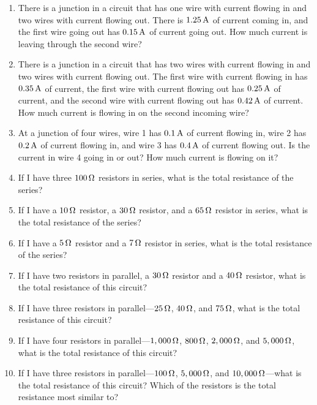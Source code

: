 
\begin{enumerate}
\item There is a junction in a circuit that has one wire with current flowing in and two wires with current flowing out.  There is $1.25\,\si{\ampere}$ of current coming in, and the first wire going out has $0.15\,\si{\ampere}$ of current going out.  How much current is leaving through the second wire?
\item There is a junction in a circuit that has two wires with current flowing in and two wires with current flowing out.  The first wire with current flowing in has $0.35\,\si{\ampere}$ of current, the first wire with current flowing out has $0.25\,\si{\ampere}$ of current, and the second wire with current flowing out has $0.42\,\si{\ampere}$ of current.  How much current is flowing in on the second incoming wire?
\item At a junction of four wires, wire 1 has $0.1\,\si{\ampere}$ of current flowing in, wire 2 has $0.2\,\si{\ampere}$ of current flowing in, and wire 3 has $0.4\,\si{\ampere}$ of current flowing out.  Is the current in wire 4 going in or out?  How much current is flowing on it?
\item If I have three $100\,\si{\ohm}$ resistors in series, what is the total resistance of the series?
\item If I have a $10\,\si{\ohm}$ resistor, a $30\,\si{\ohm}$ resistor, and a $65\,\si{\ohm}$ resistor in series, what is the total resistance of the series?
\item If I have a $5\,\si{\ohm}$ resistor and a $7\,\si{\ohm}$ resistor in series, what is the total resistance of the series?
\item If I have two resistors in parallel, a $30\,\si{\ohm}$ resistor and a $40\,\si{\ohm}$ resistor, what is the total resistance of this circuit?
\item If I have three resistors in parallel---$25\,\si{\ohm}$, $40\,\si{\ohm}$, and $75\,\si{\ohm}$, what is the total resistance of this circuit?
\item If I have four resistors in parallel---$1,000\,\si{\ohm}$, $800\,\si{\ohm}$, $2,000\,\si{\ohm}$, and $5,000\,\si{\ohm}$, what is the total resistance of this circuit?
\item If I have three resistors in parallel---$100\,\si{\ohm}$, $5,000\,\si{\ohm}$, and $10,000\,\si{\ohm}$---what is the total resistance of this circuit?  Which of the resistors is the total resistance most similar to?

\end{enumerate}
